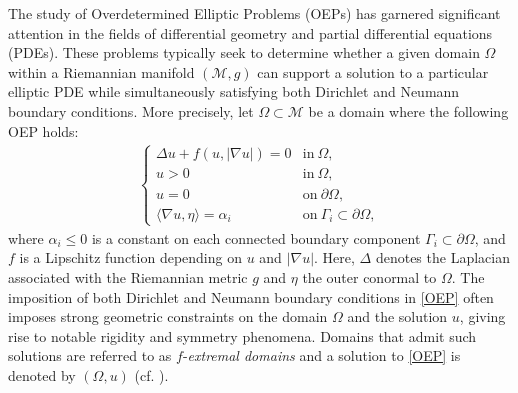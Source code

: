 \documentclass[11pt]{article}
\numberwithin{equation} {section}
\begin{document}
The study of Overdetermined Elliptic Problems (OEPs) has garnered significant attention in the fields of differential geometry and partial differential equations (PDEs). These problems typically seek to determine whether a given domain \(\Omega\) within a Riemannian manifold \((\mathcal{M}, g)\) can support a solution to a particular elliptic PDE while simultaneously satisfying both Dirichlet and Neumann boundary conditions. More precisely, let \(\Omega \subset \mathcal{M}\) be a domain where the following OEP holds:
\begin{eqnarray} \label{OEP}
    \left\{
    \begin{array}{llll}
        \Delta{u} + f(u, |\nabla u|) = 0  &\mathrm{in}~\Omega,\\
        u > 0  &\mathrm{in}~\Omega, \\
        u = 0  &\mathrm{on}~\partial\Omega,\\
        \langle\nabla{u},\eta\rangle = \alpha_i  &\mathrm{on}~\Gamma_i \subset \partial \Omega,
    \end{array}
    \right.
\end{eqnarray}
where \(\alpha_i \leq 0\) is a constant on each connected boundary component \(\Gamma_i \subset \partial \Omega\), and \(f\) is a Lipschitz function depending on \(u\) and \(|\nabla u|\). Here, \(\Delta\) denotes the Laplacian associated with the Riemannian metric \(g\)  and $\eta$ the outer conormal to $\Omega$. The imposition of both Dirichlet and Neumann boundary conditions in \eqref{OEP} often imposes strong geometric constraints on the domain \(\Omega\) and the solution \(u\), giving rise to notable rigidity and symmetry phenomena. Domains that admit such solutions are referred to as \(f\)-\textit{extremal domains} and a solution to \eqref{OEP} is denoted by \((\Omega, u)\) (cf. \cite{Ros}). 
\end{document}
